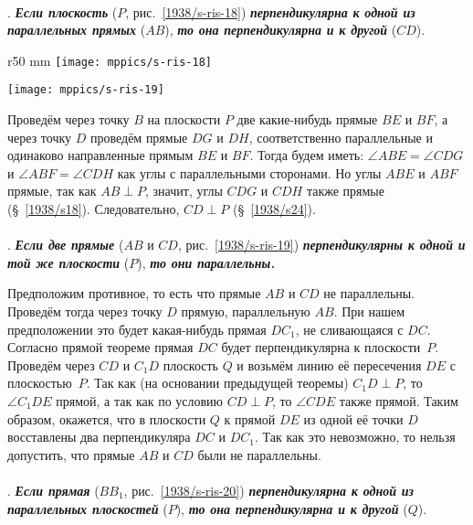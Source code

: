 \paragraph{}\label{1938/s31}
.
\textbf{\emph{Если плоскость}} ($P$, рис.~\ref{1938/s-ris-18}) \textbf{\emph{перпендикулярна к одной из параллельных прямых}} ($AB$), \textbf{\emph{то она перпендикулярна и к другой}} ($CD$).

\begin{wrapfigure}{r}{50 mm}
\centering
\texttt{[image: mppics/s-ris-18]}
\caption{}\label{1938/s-ris-18}
\bigskip
\texttt{[image: mppics/s-ris-19]}
\caption{}\label{1938/s-ris-19}
\end{wrapfigure}

Проведём через точку $B$ на плоскости $P$ две какие-нибудь прямые $BE$ и $BF$, а через точку $D$ проведём прямые $DG$ и $DH$, соответственно параллельные и одинаково направленные прямым $BE$ и $BF$.
Тогда будем иметь: $\angle ABE=\angle CDG$ и $\angle ABF = \angle CDH$ как углы с параллельными сторонами.
Но углы $ABE$ и $ABF$ прямые, так как $AB\perp P$, значит, углы $CDG$ и $CDH$ также прямые (§~\ref{1938/s18}).
Следовательно, $CD \perp P$ (§~\ref{1938/s24}).

\paragraph{}\label{1938/s32}
\mbox{.}
\textbf{\emph{Если две прямые}} ($AB$ и $CD$, рис.~\ref{1938/s-ris-19}) \textbf{\emph{перпендикулярны к одной и той же плоскости}} ($P$), \textbf{\emph{то они параллельны.}}

Предположим противное, то есть что прямые $AB$ и $CD$ не параллельны.
Проведём тогда через точку $D$ прямую, параллельную $AB$. %
При нашем предположении это будет какая-нибудь прямая $DC_1$, не сливающаяся с $DC$.
Согласно прямой теореме прямая $DC$ будет перпендикулярна к плоскости~$P$.
Проведём через $CD$ и $C_1D$ плоскость $Q$ и возьмём линию её пересечения $DE$ с плоскостью~$P$.
Так как (на основании предыдущей теоремы) $C_1D \perp P$, то $\angle C_1DE$ прямой, а так как по условию $CD \perp P$, то $\angle CDE$ также прямой.
Таким образом, окажется, что в плоскости $Q$ к прямой $DE$ из одной её точки $D$ восставлены два перпендикуляра $DC$ и $DC_1$.
Так как это невозможно, %
то нельзя допустить, что прямые $AB$ и $CD$ были не параллельны.

\paragraph{}\label{1938/s33}
.
\textbf{\emph{Если прямая}} ($BB_1$, рис.~\ref{1938/s-ris-20}) \textbf{\emph{перпендикулярна к одной из параллельных плоскостей}} ($P$), \textbf{\emph{то она перпендикулярна и к другой}} ($Q$).

